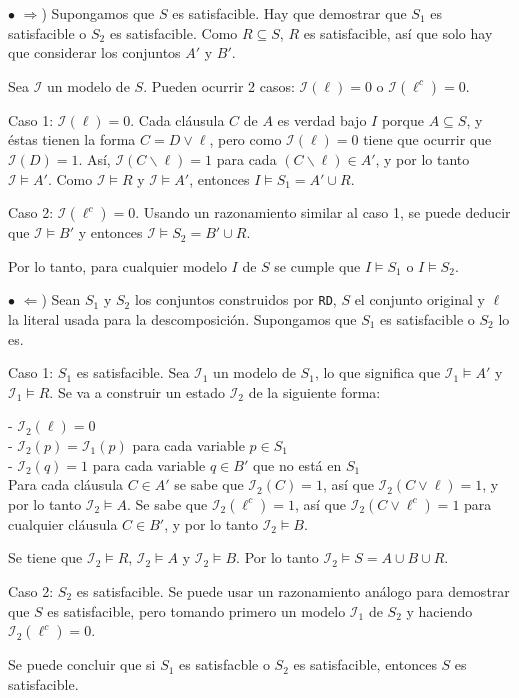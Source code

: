 \documentclass{article}
\begin{document}
\begin{itemize}
$\bullet$ $\Rightarrow$) Supongamos que $S$ es satisfacible. Hay que demostrar que $S_1$ es satisfacible o $S_2$ es satisfacible. Como $R \subseteq S$, $R$ es satisfacible, así que solo hay que considerar los conjuntos $A'$ y $B'$.

Sea $\mathcal{I}$ un modelo de $S$. Pueden ocurrir 2 casos: $\mathcal{I} (\ell) = 0$ o $\mathcal{I} (\ell^{c}) = 0$.

Caso 1: $\mathcal{I} (\ell) = 0$. Cada cláusula $C$ de $A$ es verdad bajo $I$ porque $A \subseteq S$, y éstas tienen la forma $C=D \vee \ell$, pero como $\mathcal{I} (\ell) = 0$ tiene que ocurrir que $\mathcal{I} (D) = 1$. Así, $\mathcal{I} (C \backslash \ell) = 1$ para cada $(C \backslash \ell) \in A'$, y por lo tanto $\mathcal{I} \models A'$. Como $\mathcal{I} \models R$ y $\mathcal{I} \models A'$, entonces $I \models S_1 = A' \cup R$.

Caso 2: $\mathcal{I} (\ell^{c}) = 0$. Usando un razonamiento similar al caso 1, se puede deducir que $\mathcal{I} \models B'$ y entonces $\mathcal{I} \models S_2 = B' \cup R$.

Por lo tanto, para cualquier modelo $I$ de $S$ se cumple que $I \models S_1$ o $I \models S_2$.

$\bullet$ $\Leftarrow$) Sean $S_1$ y $S_2$ los conjuntos construidos por \texttt{RD}, $S$ el conjunto original y $\ell$ la literal usada para la descomposición. Supongamos que $S_1$ es satisfacible o $S_2$ lo es.

Caso 1: $S_1$ es satisfacible. Sea $\mathcal{I}_1$ un modelo de $S_1$, lo que significa que $\mathcal{I}_1 \models A'$ y $\mathcal{I}_1 \models R$. Se va a construir un estado $\mathcal{I}_2$ de la siguiente forma:

- $\mathcal{I}_2 (\ell) = 0$\\
- $\mathcal{I}_2 (p) = \mathcal{I}_1 (p)$ para cada variable $p \in S_1$\\
- $\mathcal{I}_2 (q) = 1$ para cada variable $q \in B'$ que no está en $S_1$\\

Para cada cláusula $C \in A'$ se sabe que $\mathcal{I}_2 (C) = 1$, así que $\mathcal{I}_2 (C \vee \ell) = 1$, y por lo tanto $\mathcal{I}_2 \models A$. Se sabe que $\mathcal{I}_2 (\ell^{c}) = 1$, así que $\mathcal{I}_2 (C \vee \ell^{c}) = 1$ para cualquier cláusula $C \in B'$, y por lo tanto $\mathcal{I}_2 \models B$.

Se tiene que $\mathcal{I}_2 \models R$, $\mathcal{I}_2 \models A$ y $\mathcal{I}_2 \models B$. Por lo tanto $\mathcal{I}_2 \models S = A \cup B \cup R$.

Caso 2: $S_2$ es satisfacible. Se puede usar un razonamiento análogo para demostrar que $S$ es satisfacible, pero tomando primero un modelo $\mathcal{I}_1$ de $S_2$ y haciendo $\mathcal{I}_2 (\ell^{c}) = 0$.

Se puede concluir que si $S_1$ es satisfacble o $S_2$ es satisfacible, entonces $S$ es satisfacible.

\end{itemize}
\end{document}
